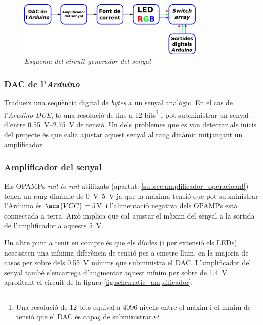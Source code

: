 \begin{figure}[htp]
	\centering
	\includegraphics[width=0.8\textwidth]{Figures/esquema_circuit_generador.pdf}
	\caption[Esquema del circuit generador del senyal]{\textit{Esquema del circuit generador del senyal}}
	\label{fig:esquema_circuit_generador}
\end{figure}

\subsubsection{\acs{DAC} de l'\hyperref[subsec:arduino]{\textit{Arduino}}}

Tradueix una seqüència digital de \textit{bytes} a un senyal analògic. En el cas de l'\textit{Arudino DUE}, té una resolució de fins a \num{12} bits\footnote{Una resolució de \num{12} bits equival a \num{4096} nivells entre el màxim i el mínim de tensió que el \ac{DAC} és capaç de subministrar.} i pot subministrar un senyal d'entre \SIrange[range-phrase = \ i\ ]{0.55}{2.75}{\volt} de tensió. Un dels problemes que es van detectar als inicis del projecte és que calia ajustar aquest senyal al rang dinàmic mitjançant un amplificador.

\subsubsection{Amplificador del senyal}

Els \acp{OPAMP} \textit{rail-to-rail} utilitzats (apartat: \ref{subsec:amplificador_operacioanl}) tenen un rang dinàmic de \SIrange[range-phrase = \ a\ ]{0}{5}{\volt} ja que la màxima tensió que pot subministrar l'Arduino és $ \acs{VCC} = \SI{5}{\volt} $ i l'alimentació negativa dels \acp{OPAMP} està connectada a terra. Això implica que cal ajustar el màxim del senyal a la sortida de l'amplificador a aquests \SI{5}{\volt}. 

Un altre punt a tenir en compte és que els díodes (i per extensió els \acp{LED}) necessiten una mínima diferència de tensió per a emetre llum, en la majoria de casos per sobre dels \SI{0.55}{\volt} mínims que subministra el \ac{DAC}. L'amplificador del senyal també s'encarrega d'augmentar aquest mínim per sobre de \SI{1.4}{\volt} aprofitant el circuit de la figura \ref{fig:schematic_amplificador}.

